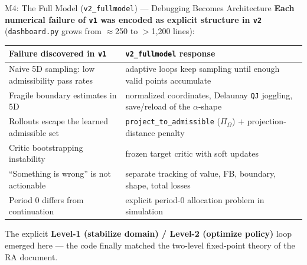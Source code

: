 \documentclass[10pt,aspectratio=169]{beamer}
\newcommand{\compacttables}{\renewcommand{\arraystretch}{1.15}}
\begin{document}
\begin{frame}{M4: The Full Model (\texttt{v2\_fullmodel}) --- Debugging Becomes Architecture}
\textbf{Each numerical failure of \texttt{v1} was encoded as explicit structure in \texttt{v2}} (\texttt{dashboard.py} grows from $\approx$250 to $>$1{,}200 lines):

\smallskip
\compacttables
\begin{center}\footnotesize
\renewcommand{\arraystretch}{1.0}
\begin{tabular}{p{5.5cm}p{6.4cm}}
\toprule
\textbf{Failure discovered in \texttt{v1}} & \textbf{\texttt{v2\_fullmodel} response} \\
\midrule
Naive 5D sampling: low admissibility pass rates & adaptive loops keep sampling until enough valid points accumulate \\
Fragile boundary estimates in 5D & normalized coordinates, Delaunay \texttt{QJ} joggling, save/reload of the $\alpha$-shape \\
Rollouts escape the learned admissible set & \texttt{project\_to\_admissible} ($\Pi_\Omega$) $+$ projection-distance penalty \\
Critic bootstrapping instability & frozen target critic with soft updates \\
``Something is wrong'' is not actionable & separate tracking of value, FB, boundary, shape, total losses \\
Period 0 differs from continuation & explicit period-0 allocation problem in simulation \\
\bottomrule
\end{tabular}
\end{center}
\begin{block}{}
\small The explicit \textbf{Level-1 (stabilize domain) / Level-2 (optimize policy)} loop emerged here ---
the code finally matched the two-level fixed-point theory of the RA document.
\end{block}
\end{frame}
\end{document}
